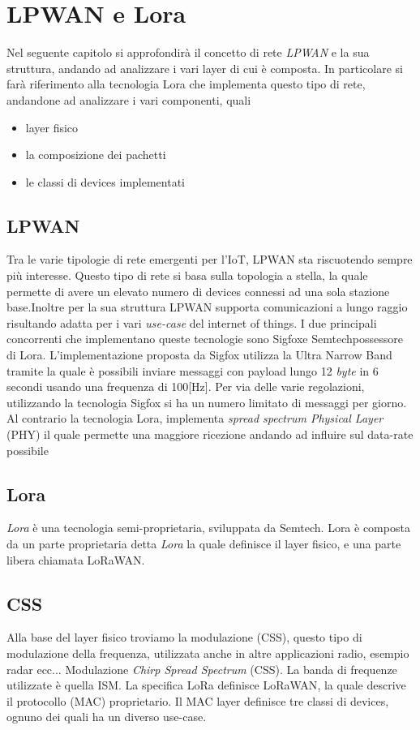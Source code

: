 \chapter{LPWAN e Lora}
Nel seguente capitolo si approfondirà il concetto di rete \emph{LPWAN} e la sua
struttura, andando ad analizzare i vari layer di cui è composta. 
In particolare si farà riferimento alla tecnologia Lora che implementa questo
tipo di rete, andandone ad analizzare i vari componenti, quali
\begin{itemize}
\item layer fisico
\item la composizione dei pachetti 
\item le classi di devices implementati
\end{itemize}

\section{LPWAN}
Tra le varie tipologie di rete emergenti per l'IoT, LPWAN sta riscuotendo sempre
più interesse. Questo tipo di rete si basa sulla topologia a stella, la quale
permette di avere un elevato numero di devices connessi ad una sola stazione
base.Inoltre per la sua struttura LPWAN supporta comunicazioni a lungo raggio
risultando adatta per i vari \emph{use-case} del internet of things. I due
principali concorrenti che implementano queste tecnologie sono Sigfox\tm e
Semtech\tm possessore di Lora\tm. L'implementazione proposta da Sigfox utilizza
la Ultra Narrow Band tramite la quale è possibili inviare messaggi con payload
lungo 12 \emph{byte} in 6 secondi usando una frequenza di 100[Hz]. Per via delle
varie regolazioni, utilizzando la tecnologia Sigfox si ha un numero limitato di
messaggi per giorno.
Al contrario la tecnologia Lora, implementa \emph{spread spectrum Physical
Layer} (PHY) il quale permette una maggiore ricezione andando ad influire sul
data-rate possibile

\section{Lora}
\emph{Lora} è una tecnologia semi-proprietaria, sviluppata da Semtech. Lora è
composta da un parte proprietaria detta \emph{Lora}\cite{LoRaCss101} la quale definisce il layer
fisico, e una parte libera chiamata LoRaWAN\cite{LoRaWAN101}.


\section{CSS}
Alla base del layer fisico troviamo la modulazione (CSS), questo tipo di
modulazione della frequenza, utilizzata anche in altre applicazioni radio, 
esempio radar ecc...
Modulazione \emph{Chirp Spread Spectrum} (CSS). La banda di frequenze utilizzate
è quella ISM. La specifica LoRa definisce LoRaWAN\cite{LoRaWAN101}, la quale
descrive il protocollo (MAC) proprietario. Il MAC layer definisce tre classi di
devices, ognuno dei quali ha un diverso use-case.

